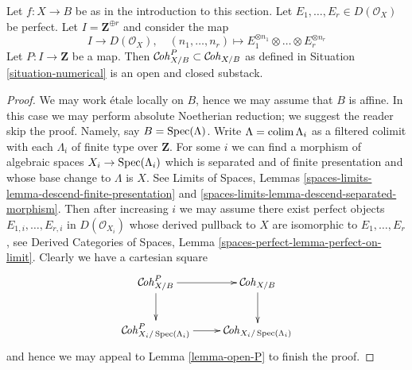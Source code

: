 \begin{lemma}
\label{lemma-finite-list-perfect-objects}
Let $f : X \to B$ be as in the introduction to this section.
Let $E_1, \ldots, E_r \in D(\mathcal{O}_X)$ be perfect.
Let $I = \mathbf{Z}^{\oplus r}$ and consider the map
$$
I \longrightarrow D(\mathcal{O}_X),\quad
(n_1, \ldots, n_r) \longmapsto
E_1^{\otimes n_1}
\otimes \ldots \otimes
E_r^{\otimes n_r}
$$
Let $P : I \to \mathbf{Z}$ be a map. Then
$\mathcal{C}\!\mathit{oh}^P_{X/B} \subset \mathcal{C}\!\mathit{oh}_{X/B}$
as defined in Situation \ref{situation-numerical}
is an open and closed substack.
\end{lemma}

\begin{proof}
We may work \'etale locally on $B$, hence we may assume that $B$ is affine.
In this case we may perform absolute Noetherian reduction; we suggest
the reader skip the proof. Namely, say $B = \mathop{\mathrm{Spec}}(\Lambda)$.
Write $\Lambda = \mathop{\mathrm{colim}}\nolimits \Lambda_i$ as a filtered colimit with each $\Lambda_i$
of finite type over $\mathbf{Z}$. For some $i$ we can find
a morphism of algebraic spaces $X_i \to \mathop{\mathrm{Spec}}(\Lambda_i)$
which is separated and of finite presentation and whose base change
to $\Lambda$ is $X$. See Limits of Spaces, Lemmas
\ref{spaces-limits-lemma-descend-finite-presentation} and
\ref{spaces-limits-lemma-descend-separated-morphism}.
Then after increasing $i$ we may assume there exist
perfect objects $E_{1, i}, \ldots, E_{r, i}$
in $D(\mathcal{O}_{X_i})$ whose derived pullback to $X$
are isomorphic to $E_1, \ldots, E_r$, see
Derived Categories of Spaces, Lemma
\ref{spaces-perfect-lemma-perfect-on-limit}.
Clearly we have a cartesian square
$$
\xymatrix{
\Cohstack^P_{X/B} \ar[r] \ar[d] &
\Cohstack_{X/B} \ar[d] \\
\Cohstack^P_{X_i/\Spec(\Lambda_i)} \ar[r] &
\Cohstack_{X_i/\Spec(\Lambda_i)}
}
$$
and hence we may appeal to Lemma \ref{lemma-open-P}
to finish the proof.
\end{proof}

